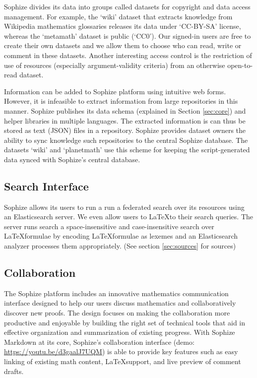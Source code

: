 \documentclass[runningheads]{llncs}
\begin{document}
Sophize divides its data into groups called datasets for copyright and data access management. For example, the `wiki' dataset that extracts knowledge from Wikipedia mathematics glossaries releases its data under `CC-BY-SA' license, whereas the `metamath' dataset is public (`CC0'). Our signed-in users are free to create their own datasets and we allow them to choose who can read, write or comment in these datasets. Another interesting access control is the restriction of use of resources (especially argument-validity criteria) from an otherwise open-to-read dataset.

Information can be added to Sophize platform using intuitive web forms. However, it is infeasible to extract information from large repositories in this manner. Sophize publishes its data schema (explained in Section \ref{sec:core}) and helper libraries in multiple languages. The extracted information is can thus be stored as text (JSON) files in a repository. Sophize provides dataset owners the ability to sync knowledge such repositories to the central Sophize database. The datasets `wiki' and `planetmath' use this scheme for keeping the script-generated data synced with Sophize's central database.

\subsection{Search Interface}
\label{sec:search}
Sophize allows its users to run a run a federated search over its resources using an Elasticsearch server. We even allow users to \LaTeX to their search queries. The server runs search a space-insensitive and case-insensitive search over \LaTeX\space formulae by encoding \LaTeX\space formulae as lexemes and an Elasticsearch analyzer processes them appropriately. (See section \ref{sec:sources} for sources)

\subsection{Collaboration}

The Sophize platform includes an innovative mathematics communication interface designed to help our users discuss mathematics and collaboratively discover new proofs. The design focuses on making the collaboration more productive and enjoyable by building the right set of technical tools that aid in effective organization and summarization of existing progress. With Sophize Markdown at its core, Sophize's collaboration interface\cite{EasyChair6207}  (demo: \url{https://youtu.be/d3gaalJ7UQM}) is able to provide key features such as easy linking of existing math content, \LaTeX\space support, and live preview of comment drafts.
\end{document}
